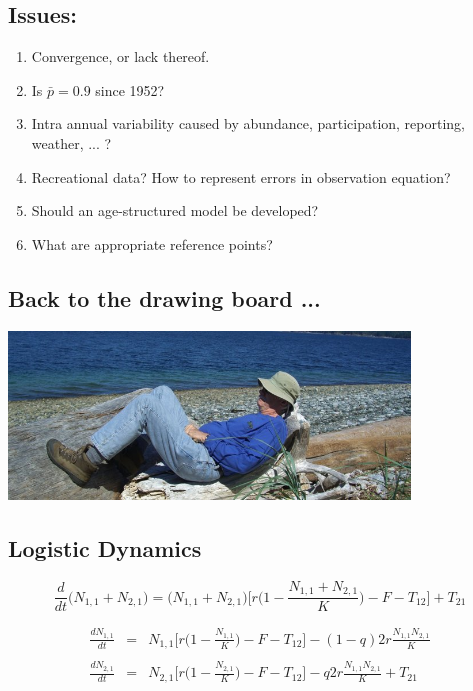 \documentclass[a4paper,KOMA,landscape,titlepage]{powersem}
\newcommand\None{{N_{1,1}}}
\newcommand\Ntwo{{N_{2,1}}}
\newcommand\Nsum{{N_{1,1}+N_{2,1}}}
\begin{document}
\begin{slide}\section{Issues:}
\begin{enumerate}
\item Convergence, or lack thereof.
\item Is $\bar{p} = 0.9$ since 1952?
\item Intra annual variability caused by abundance, participation,
reporting, weather, ... ?
\item Recreational data? How to represent errors in observation
equation?
\item Should an age-structured model be developed?
\item What are appropriate reference points?
\end{enumerate}
\end{slide}

\begin{slide}\section{Back to the drawing board ...}
\begin{center}
\includegraphics[width=0.8\textwidth]{./graphics/recumbant.png}
\end{center}
\end{slide}


\begin{slide}\section{Logistic Dynamics}
\begin{center}
\begin{equation}
\frac{d}{dt}\big(\Nsum\big)=\big(\Nsum\big)\Big[r\Big(1-\frac{\Nsum}{K}\Big)-F-T_{12}\Big]+T_{21}
\label{eqn:logistic}
\end{equation}
\vspace{2ex}

\begin{eqnarray}
\label{eqn:coupledschaeferq}
\frac{d\None}{dt}&=&\None\Big[r\Big(1-\frac{\None}{K}\Big)
-F - T_{12}\Big] - (1-q)2r\frac{\None\Ntwo}{K}\nonumber\\
\\
\frac{d\Ntwo}{dt}&=&\Ntwo\Big[r\Big(1-\frac{\Ntwo}{K}\Big)
-F - T_{12}\Big] - q2r\frac{\None\Ntwo}{K} + T_{21}\nonumber
\end{eqnarray}
\end{center}
\end{slide}
\end{document}
